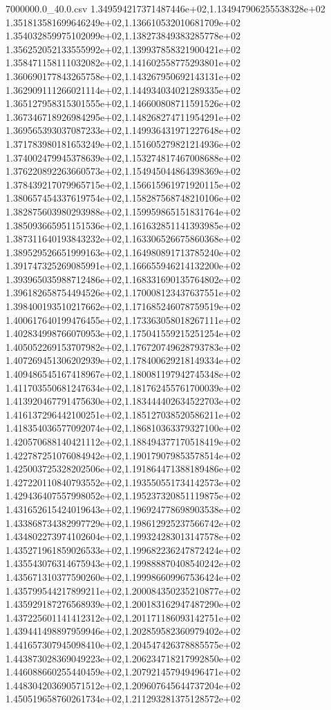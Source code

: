 \begin{filecontents*}{7000000.0_40.0.csv}
1.349594217371487446e+02,1.134947906255538328e+02
1.351813581699646249e+02,1.136610532010681709e+02
1.354032859975102099e+02,1.138273849383285778e+02
1.356252052133555992e+02,1.139937858321900421e+02
1.358471158111032082e+02,1.141602558775293801e+02
1.360690177843265758e+02,1.143267950692143131e+02
1.362909111266021114e+02,1.144934034021289335e+02
1.365127958315301555e+02,1.146600808711591526e+02
1.367346718926984295e+02,1.148268274711954291e+02
1.369565393037087233e+02,1.149936431971227648e+02
1.371783980181653249e+02,1.151605279821214936e+02
1.374002479945378639e+02,1.153274817467008688e+02
1.376220892263660573e+02,1.154945044864398369e+02
1.378439217079965715e+02,1.156615961971920115e+02
1.380657454337619754e+02,1.158287568748210106e+02
1.382875603980293988e+02,1.159959865151831764e+02
1.385093665951151536e+02,1.161632851141393985e+02
1.387311640193843232e+02,1.163306526675860368e+02
1.389529526651999163e+02,1.164980891713785240e+02
1.391747325269085991e+02,1.166655946214132200e+02
1.393965035988712486e+02,1.168331690135764802e+02
1.396182658754494526e+02,1.170008123437637551e+02
1.398400193510217662e+02,1.171685246078759519e+02
1.400617640199476455e+02,1.173363058018267111e+02
1.402834998766070953e+02,1.175041559215251254e+02
1.405052269153707982e+02,1.176720749628793783e+02
1.407269451306202939e+02,1.178400629218149334e+02
1.409486545167418967e+02,1.180081197942745348e+02
1.411703550681247634e+02,1.181762455761700039e+02
1.413920467791475630e+02,1.183444402634522703e+02
1.416137296442100251e+02,1.185127038520586211e+02
1.418354036577092074e+02,1.186810363379327100e+02
1.420570688140421112e+02,1.188494377170518419e+02
1.422787251076084942e+02,1.190179079853578514e+02
1.425003725328202506e+02,1.191864471388189486e+02
1.427220110840793552e+02,1.193550551734142573e+02
1.429436407557998052e+02,1.195237320851119875e+02
1.431652615424019643e+02,1.196924778698903538e+02
1.433868734382997729e+02,1.198612925237566742e+02
1.434802273974102604e+02,1.199324283013147578e+02
1.435271961859026533e+02,1.199682236247872424e+02
1.435543076314675943e+02,1.199888870408540242e+02
1.435671310377590260e+02,1.199986609967536424e+02
1.435799544217899211e+02,1.200084350235210877e+02
1.435929187276568939e+02,1.200183162947487290e+02
1.437225601141412312e+02,1.201171186093142751e+02
1.439441498897959946e+02,1.202859582360979402e+02
1.441657307945098410e+02,1.204547426378885575e+02
1.443873028369049223e+02,1.206234718217992850e+02
1.446088660255440459e+02,1.207921457949496471e+02
1.448304203690571512e+02,1.209607645644737204e+02
1.450519658760261734e+02,1.211293281375128572e+02

\end{filecontents*}
